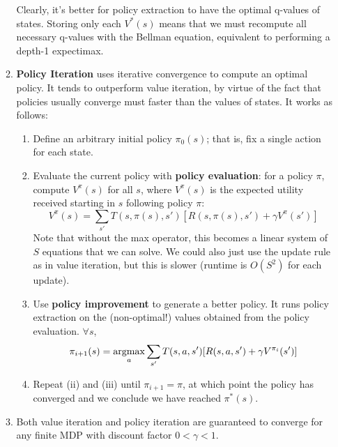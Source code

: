 \documentclass[10pt]{article}
\newcommand{\argmax}{\operatornamewithlimits{argmax}}
\begin{document}
\begin{multicols}{2}
\begin{enumerate}
\begin{enumerate}
            Clearly, it’s better for policy extraction to have the optimal q-values of states. Storing only each $V^*(s)$ means that we must recompute all necessary q-values with the Bellman equation, equivalent to performing a depth-1 expectimax.
            \item \textbf{Policy Iteration} uses iterative convergence to compute an optimal policy. It tends to outperform value iteration, by virtue of the fact that policies usually converge must faster than the values of states. It works as follows:
            \begin{enumerate}
                \item Define an arbitrary initial policy $\pi_0(s)$; that is, fix a single action for each state.
                \item Evaluate the current policy with \textbf{policy evaluation}: for a policy $\pi$, compute $V^\pi(s)$ for all $s$, where $V^\pi(s)$ is the expected utility received starting in $s$ following policy $\pi$: $$V^\pi(s)=\sum_{s'} T(s,\pi(s),s') [R(s,\pi(s),s')+\gamma V^\pi(s')]$$
                Note that without the max operator, this becomes a linear system of $S$ equations that we can solve. We could also just use the update rule as in value iteration, but this is slower (runtime is $O(S^2)$ for each update).
                \item Use \textbf{policy improvement} to generate a better policy. It runs policy extraction on the (non-optimal!) values obtained from the policy evaluation. $\forall s$,
                $$\pi_{i+1}(s)=\argmax_{a} \sum_{s'} T(s,a,s') [R(s,a,s')+\gamma V^{\pi_i}(s')]$$
                \item Repeat (ii) and (iii) until $\pi_{i+1}=\pi$, at which point the policy has converged and we conclude we have reached $\pi^*(s)$.
            \end{enumerate}
        \item Both value iteration and policy iteration are guaranteed to converge for any finite MDP with discount factor $0 < \gamma < 1$.
    \end{enumerate}
    

\end{enumerate}
\end{multicols}
\end{document}
